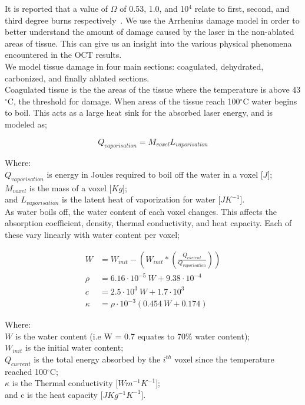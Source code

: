 It is reported that a value of $\Omega$ of 0.53, 1.0, and 10$^4$ relate to first, second, and third degree burns respectively~\cite{diller1983finite}. We use the Arrhenius damage model in order to better understand the amount of damage caused by the laser in the non-ablated areas of tissue. This can give us an insight into the various physical phenomena encountered in the OCT results.\\

We model tissue damage in four main sections: coagulated, dehydrated, carbonized, and finally ablated sections.\\

Coagulated tissue is the the areas of the tissue where the temperature is above 43$^{\circ}$C, the threshold for damage.
When areas of the tissue reach 100$^{\circ}$C water begins to boil. This acts as a large heat sink for the absorbed laser energy, and is modeled as; 

\begin{equation}
Q_{vaporisation}=M_{voxel} L_{vaporisation}
\label{eqn:latentheat}
\end{equation}

\noindent Where:\\
	\indent $Q_{vaporisation}$ is energy in Joules required to boil off the water in a voxel [$J$];\\
	\indent $M_{voxel}$ is the mass of a voxel [$Kg$];\\
	\indent and $L_{vaporisation}$ is the latent heat of vaporization for water [$J K^{-1}$].\\
	
As water boils off, the water content of each voxel changes. This affects the absorption coefficient, density, thermal conductivity, and heat capacity. Each of these vary linearly with water content per voxel;

\begin{align}
W &= W_{init} - \left(W_{init}*\left(\tfrac{Q_{current}}{Q_{vaporisation}}\right)\right) \\
\rho &= 6.16 \cdot 10^{-5}\ W + 9.38 \cdot 10^{-4} \\
c &= 2.5 \cdot 10^{3}\ W + 1.7\cdot 10^{3} \\
\kappa &= \rho \cdot 10^{-3} (0.454\ W + 0.174)
\end{align}

\noindent Where:\\
\indent $W$ is the water content (i.e W = 0.7 equates to 70\% water content);\\
\indent $W_{init}$ is the initial water content;\\
\indent $Q_{current}$ is the total energy absorbed by the $i^{th}$ voxel since the temperature reached 100$^{\circ}$C;\\
\indent $\kappa$ is the Thermal conductivity [$W m^{-1} K^{-1}$];\\
\indent and c is the heat capacity [$J Kg^{-1} K^{-1}$].\\

